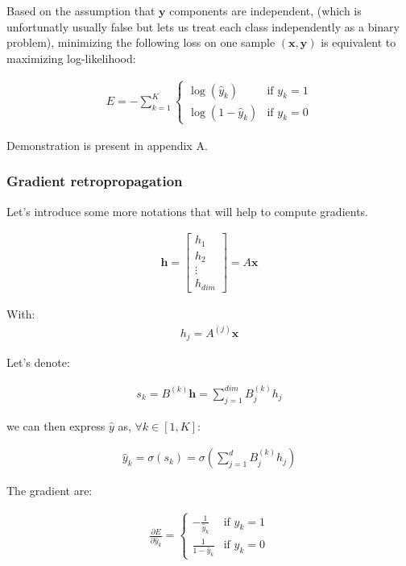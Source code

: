 Based on the assumption that $\mathbf{y}$ components are independent, (which is unfortunatly usually false but lets us treat each class independently as a binary problem), minimizing the following loss on one sample $(\mathbf{x}, \mathbf{y})$ is equivalent to maximizing log-likelihood:

\begin{align}
	E = - \sum_{k=1}^K
  			  	\left\{
				    \begin{array}{ll}
				        \log (\hat y_k) & \mbox{if } y_k =1 \\
				        \log (1 - \hat y_k) & \mbox{if } y_k =0
				    \end{array}
				\right.
\end{align}

Demonstration is present in appendix A.


\subsubsection{Gradient retropropagation}

Let's introduce some more notations that will help to compute gradients.

\begin{align}
	\mathbf{h}
	= \begin{bmatrix} 
		h_1 \\
		h_2 \\
		\vdots \\
		h_{\textit{dim}}
	\end{bmatrix}
	= A\mathbf{x}
\end{align}

With:
\begin{align}
	h_j = A^{(j)}\mathbf{x}
\end{align}


Let's denote:

\begin{align}
	s_k  = B^{(k)} \mathbf{h} = \sum_{j=1}^{\textit{dim}} B^{(k)}_j h_j 
\end{align}

we can then express $\hat y$ as, $\forall k \in [1, K]$:

\begin{align}
	\hat y_k  = \sigma(s_k) = \sigma( \sum_{j=1}^{d} B^{(k)}_j h_j) 
\end{align}


The gradient are:

\begin{align}
	\frac{ \partial E } { \partial \hat y_k } = 
		\left\{
		    \begin{array}{ll}
		        - \frac{1}{\hat y_k} & \mbox{if } y_k =1 \\
		        \frac{1}{1 - \hat y_k} & \mbox{if } y_k =0
		    \end{array}
		\right.
\end{align}


